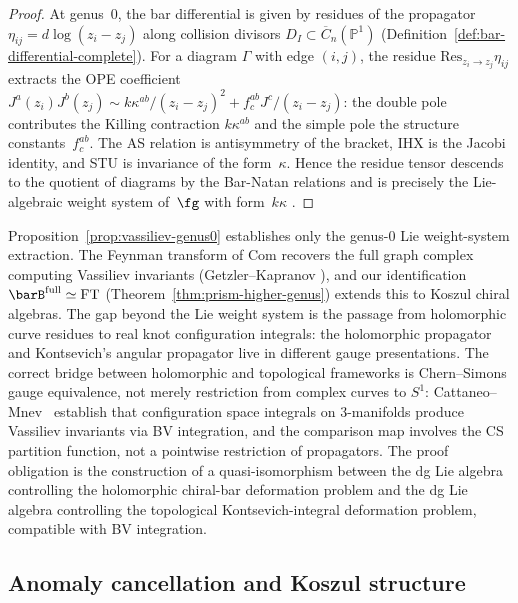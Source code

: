 \begin{proof}
At genus~$0$, the bar differential is given by residues of
the propagator $\eta_{ij} = d\log(z_i - z_j)$ along collision
divisors $D_I \subset \overline{C}_n(\mathbb{P}^1)$
(Definition~\ref{def:bar-differential-complete}). For a diagram
$\Gamma$ with edge $(i,j)$, the residue
$\mathrm{Res}_{z_i \to z_j} \eta_{ij}$ extracts the
OPE coefficient $J^a(z_i) J^b(z_j) \sim k \kappa^{ab}/(z_i-z_j)^2
+ f^{ab}_c J^c/(z_i-z_j)$: the double pole contributes the
Killing contraction $k\kappa^{ab}$ and the simple pole the
structure constants~$f^{ab}_c$. The AS relation is antisymmetry of
the bracket, IHX is the Jacobi identity, and STU is invariance of
the form~$\kappa$. Hence the residue tensor descends to the quotient
of diagrams by the Bar-Natan relations and is precisely the
Lie-algebraic weight system of~$\fg$ with form~$k\kappa$
\cite{BarNatan95}.
\end{proof}

\begin{remark}[Scope]\label{rem:vassiliev-scope}
Proposition~\ref{prop:vassiliev-genus0} establishes only the
genus-$0$ Lie weight-system extraction. The Feynman transform of
$\mathrm{Com}$
recovers the full graph complex computing Vassiliev invariants
(Getzler--Kapranov \cite{GeK98}), and our identification
$\barB^{\mathrm{full}} \simeq \mathrm{FT}$
(Theorem~\ref{thm:prism-higher-genus}) extends this to Koszul
chiral algebras. The gap beyond the Lie weight system is the passage
from holomorphic curve residues to real knot configuration integrals:
the holomorphic propagator and Kontsevich's angular propagator live in
different gauge presentations.
The correct bridge between holomorphic and topological frameworks is
Chern--Simons gauge equivalence, not merely restriction from complex
curves to $S^1$: Cattaneo--Mnev~\cite{CattaneoMnev10} establish that
configuration space integrals on $3$-manifolds produce Vassiliev
invariants via BV integration, and the comparison map involves the
CS partition function, not a pointwise restriction of propagators.
The proof obligation is the construction of a quasi-isomorphism
between the dg Lie algebra controlling the holomorphic chiral-bar
deformation problem and the dg Lie algebra controlling the topological
Kontsevich-integral deformation problem, compatible with BV
integration.
\end{remark}

\subsection{Anomaly cancellation and Koszul structure}
\label{subsec:anomaly-koszul}


